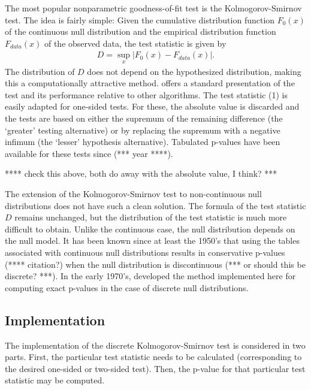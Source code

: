 The most popular nonparametric goodness-of-fit test is the
Kolmogorov-Smirnov test. The idea is fairly simple:
Given the cumulative distribution
function $F_0(x)$ of the continuous null distribution
and the empirical distribution function $F_{data}(x)$ of the observed data,  the test statistic is given by
\begin{align}
D = \sup_x \left| F_0(x)- F_{data}(x) \right|.
\end{align}
The distribution of $D$ does not depend on the hypothesized
distribution, making this a computationally
attractive method. \cite{slakter65} offers a standard presentation
of the test and its
performance relative to other algorithms. 
The test statistic (1) is easily adapted for one-sided tests.
For these, the absolute value is discarded and the tests are based
on either the supremum of the remaining difference (the `greater' testing
alternative) or by replacing the supremum with a negative infimum
(the `lesser' hypothesis alternative).  Tabulated p-values have been
available for these tests since (*** year ****).

**** check this above, both do away with the absolute value, I think? ***

The extension of the Kolmogorov-Smirnov test to non-continuous 
null distributions does not have such a clean solution. The formula of
the test statistic $D$ remains unchanged, but the distribution
of the test statistic is much more difficult to obtain. Unlike the 
continuous case, the null distribution depends on the null model.
It has been known since at least the 1950's that using the tables associated
with continuous null distributions results in conservative p-values
(**** citation?) when the null distribution is discontinuous 
(*** or should this be discrete? ***).  In the early 1970's, 
\citet{Conover1972} developed the method implemented here
for computing exact p-values
in the case of discrete null distributions.

\subsection{Implementation}

The implementation of the discrete Kolmogorov-Smirnov test is considered
in two parts. First, the particular test statistic needs to be calculated
(corresponding to the desired one-sided or two-sided test).
Then, the p-value for that particular test statistic may be computed. 

